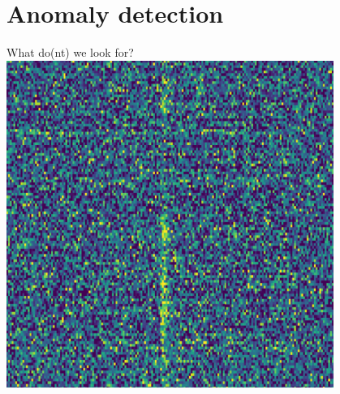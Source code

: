 \documentclass{beamer}
\begin{document}
  \section{Anomaly detection}

  \begin{frame}{What do(nt) we look for?}
    \centering
    \includegraphics[width=0.8\textwidth]{frb.png}
  \end{frame}
\end{document}

